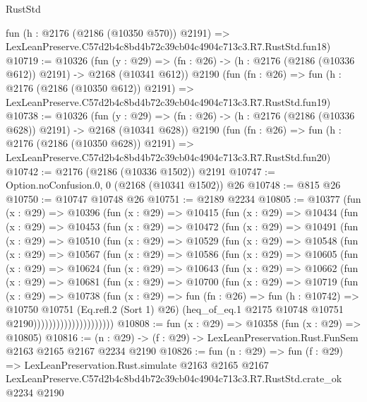 \begin{lexlean}{RustStd}
\begin{coremodule}
    fun (h : @2176 (@2186 (@10350 @570)) @2191) =>
    LexLeanPreserve.C57d2b4c8bd4b72c39cb04c4904c713c3.R7.RustStd.fun18)
@10719 := @10326
    (fun (y : @29) => (fn : @26) -> (h : @2176 (@2186 (@10336 @612)) @2191) -> @2168 (@10341 @612))
    @2190
    (fun (fn : @26) =>
    fun (h : @2176 (@2186 (@10350 @612)) @2191) =>
    LexLeanPreserve.C57d2b4c8bd4b72c39cb04c4904c713c3.R7.RustStd.fun19)
@10738 := @10326
    (fun (y : @29) => (fn : @26) -> (h : @2176 (@2186 (@10336 @628)) @2191) -> @2168 (@10341 @628))
    @2190
    (fun (fn : @26) =>
    fun (h : @2176 (@2186 (@10350 @628)) @2191) =>
    LexLeanPreserve.C57d2b4c8bd4b72c39cb04c4904c713c3.R7.RustStd.fun20)
@10742 := @2176 (@2186 (@10336 @1502)) @2191
@10747 := Option.noConfusion.{0, 0} (@2168 (@10341 @1502)) @26
@10748 := @815 @26
@10750 := @10747 @10748 @26
@10751 := @2189 @2234
@10805 := @10377
    (fun (x : @29) =>
    @10396
      (fun (x : @29) =>
      @10415
        (fun (x : @29) =>
        @10434
          (fun (x : @29) =>
          @10453
            (fun (x : @29) =>
            @10472
              (fun (x : @29) =>
              @10491
                (fun (x : @29) =>
                @10510
                  (fun (x : @29) =>
                  @10529
                    (fun (x : @29) =>
                    @10548
                      (fun (x : @29) =>
                      @10567
                        (fun (x : @29) =>
                        @10586
                          (fun (x : @29) =>
                          @10605
                            (fun (x : @29) =>
                            @10624
                              (fun (x : @29) =>
                              @10643
                                (fun (x : @29) =>
                                @10662
                                  (fun (x : @29) =>
                                  @10681
                                    (fun (x : @29) =>
                                    @10700
                                      (fun (x : @29) =>
                                      @10719
                                        (fun (x : @29) =>
                                        @10738
                                          (fun (x : @29) =>
                                          fun (fn : @26) =>
                                          fun (h : @10742) =>
                                          @10750
                                            @10751
                                            (Eq.refl.{2} (Sort 1) @26)
                                            (heq_of_eq.{1}
                                              @2175
                                              @10748
                                              @10751
                                              @2190)))))))))))))))))))))
@10808 := fun (x : @29) => @10358 (fun (x : @29) => @10805)
@10816 := (n : @29) -> (f : @29) -> LexLeanPreservation.Rust.FunSem @2163 @2165 @2167 @2234 @2190
@10826 := fun (n : @29) =>
  fun (f : @29) =>
  LexLeanPreservation.Rust.simulate
    @2163
    @2165
    @2167
    LexLeanPreserve.C57d2b4c8bd4b72c39cb04c4904c713c3.R7.RustStd.crate_ok
    @2234
    @2190
\end{coremodule}
\end{lexlean}
